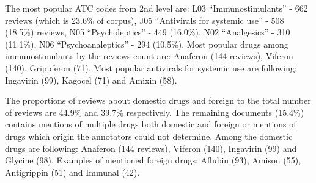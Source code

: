 \documentclass[a4paper,fleqn,longmktitle]{cas-dc}
\begin{document}
The most popular ATC codes from 2nd level are: L03 ``Immunostimulants'' - 662 reviews (which is 23.6\% of corpus), J05 ``Antivirals for systemic use'' - 508 (18.5\%) reviews, N05 ``Psycholeptics'' - 449 (16.0\%), N02 ``Analgesics'' - 310 (11.1\%), N06 ``Psychoanaleptics'' - 294 (10.5\%). Most popular drugs among immunostimulants by the reviews count are: Anaferon (144 reviews), Viferon (140), Grippferon (71). Most popular antivirals for systemic use are following: Ingavirin (99), Kagocel (71) and Amixin (58).

The proportions of reviews about domestic drugs and foreign to the total number of reviews are 44.9\% and 39.7\% respectively. The remaining documents (15.4\%) contains mentions of multiple drugs both domestic and foreign or mentions of drugs which origin the annotators could not determine. Among the domestic drugs are following: Anaferon (144 reviews), Viferon (140), Ingavirin (99) and Glycine (98). Examples of mentioned foreign drugs: Aflubin (93), Amison (55),  Antigrippin (51) and Immunal (42).
\end{document}
